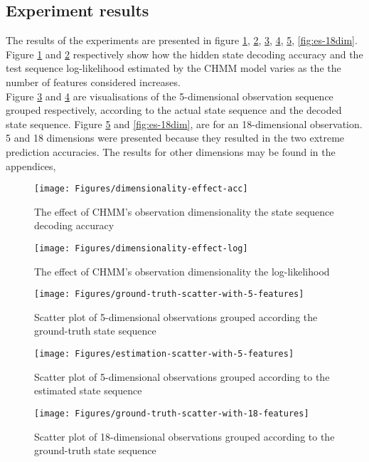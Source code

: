\subsection{Experiment results}
The results of the experiments are presented in figure \ref{fig:dim-acc}, \ref{fig:dim-log}, \ref{fig:gt-5dim}, \ref{fig:es-5dim}, \ref{fig:gt-18dim}, \ref{fig:es-18dim}.\\
Figure \ref{fig:dim-acc} and \ref{fig:dim-log} respectively show how the hidden state decoding accuracy and the test sequence log-likelihood estimated by the CHMM model varies as the the number of features considered increases.\\
Figure \ref{fig:gt-5dim} and \ref{fig:es-5dim} are visualisations of the 5-dimensional observation sequence grouped respectively, according to the actual state sequence and the decoded state sequence. Figure \ref{fig:gt-18dim} and \ref{fig:es-18dim}, are for an 18-dimensional observation.
5 and 18 dimensions were presented because they resulted in the two extreme prediction accuracies. The results for other dimensions may be found in the appendices, %
\begin{figure}[ht!]
	\centering
	\texttt{[image: Figures/dimensionality-effect-acc]}
	\caption{The effect of CHMM's observation dimensionality the state sequence decoding accuracy}
	\label{fig:dim-acc}
\end{figure}

\begin{figure}[ht!]
	\texttt{[image: Figures/dimensionality-effect-log]}
	\caption{The effect of CHMM's observation dimensionality the log-likelihood}
	\label{fig:dim-log}
\end{figure}


\begin{figure}[ht!]
	\texttt{[image: Figures/ground-truth-scatter-with-5-features]}
	\caption{Scatter plot of  5-dimensional observations grouped according the ground-truth state sequence}
	\label{fig:gt-5dim}
\end{figure}
\begin{figure}[ht!]
	\texttt{[image: Figures/estimation-scatter-with-5-features]}
	\caption{Scatter plot of 5-dimensional observations grouped according to the estimated state sequence}
	\label{fig:es-5dim}
\end{figure}

\begin{figure}[ht!]
	\texttt{[image: Figures/ground-truth-scatter-with-18-features]}
	\caption{Scatter plot of 18-dimensional observations grouped according to the ground-truth state sequence}
	\label{fig:gt-18dim}
\end{figure}

